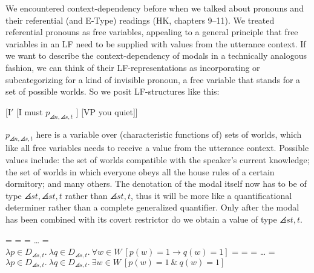 We encountered context-dependency before when we talked about pronouns and their
referential (and E-Type) readings (H\amp K, chapters 9--11). We treated
referential pronouns as free variables, appealing to a general principle that
free variables in an LF need to be supplied with values from the utterance
context. If we want to describe the context-dependency of modals in a
technically analogous fashion, we can think of their LF-representations as
incorporating or subcategorizing for a kind of invisible pronoun, a free
variable that stands for a set of possible worlds.
So we posit LF-structures like this:

\ex \label{newlf} [I$'$ [I must $p_{\angles{n,\angles{s,t}}}$ ] [VP you quiet]] \xe

%
$p_{\angles{n,\angles{s,t}}}$ here is a variable over (characteristic
functions of) sets of worlds, which \dash like all free variables
\dash needs to receive a value from the utterance context. Possible
values include: the set of worlds compatible with the speaker's
current knowledge; the set of worlds in which everyone obeys all the
house rules of a certain dormitory; and many others. The denotation of
the modal itself now has to be of type $\angles{st,\angles{st,t}}$
rather than $\angles{st,t}$, thus it will be more like a
quantificational determiner rather than a complete generalized
quantifier. Only after the modal has been combined with its covert
restrictor do we obtain a value of type $\angles{st,t}$.

\pex \a {} =  =  = \dots{} =\\
$\lambda p\in D_{\angles{s,t}}.\ \lambda q\in D_{\angles{s,t}}.\ \forall w\in W\ [p(w)=1 \rightarrow q(w)=1]$
\a {} =  =  = \dots{} =\\
$\lambda p\in D_{\angles{s,t}}.\ \lambda q\in D_{\angles{s,t}}.\ \exists w\in W\
[p(w)=1\ \&\ q(w)=1]$ \xe

